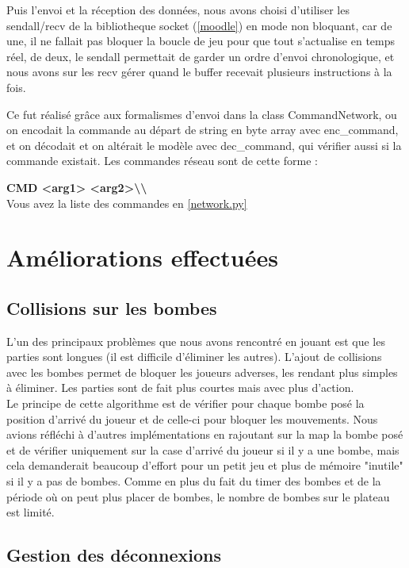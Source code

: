 \documentclass[a4paper]{article}
\begin{document}
		Puis l'envoi et la réception des données, nous avons choisi d'utiliser les sendall/recv de la bibliotheque socket (\ref{moodle}) en mode non bloquant, car de une, il ne fallait pas bloquer la boucle de jeu pour que tout s'actualise en temps réel, de deux, le sendall permettait de garder un ordre d'envoi chronologique, et nous avons sur les recv gérer quand le buffer recevait plusieurs instructions à la fois. 
		
		Ce fut réalisé grâce aux formalismes d'envoi dans la class CommandNetwork, ou on encodait la commande au départ de string en byte array avec enc\_command, et on décodait et on altérait le modèle avec dec\_command, qui vérifier aussi si la commande existait. Les commandes réseau sont de cette forme :
		
		\textbf{CMD <arg1> <arg2>\textbackslash\textbackslash}
		\\
		
		Vous avez la liste des commandes en \ref{network.py}

	\section{Améliorations effectuées}
		\subsection{Collisions sur les bombes}
		L'un des principaux problèmes que nous avons rencontré en jouant est que les parties sont longues (il est difficile d'éliminer les autres).
		L'ajout de collisions avec les bombes permet de bloquer les joueurs adverses, les rendant plus simples à éliminer.
		Les parties sont de fait plus courtes mais avec plus d'action.
		\\
		
		Le principe de cette algorithme est de vérifier pour chaque bombe posé la position d'arrivé du joueur et de celle-ci pour bloquer les mouvements. Nous avions réfléchi à d'autres implémentations en rajoutant sur la map la bombe posé et de vérifier uniquement sur la case d'arrivé du joueur si il y a une bombe, mais cela demanderait beaucoup d'effort pour un petit jeu et plus de mémoire "inutile" si il y a pas de bombes. Comme en plus du fait du timer des bombes et de la période où on peut plus placer de bombes, le nombre de bombes sur le plateau est limité.
		
		
		
		\subsection{Gestion des déconnexions}
		
\end{document}
